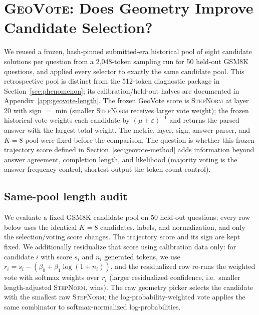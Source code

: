 \section{\textsc{GeoVote}: Does Geometry Improve Candidate Selection?}
\label{sec:geovote}

We reused a frozen, hash-pinned submitted-era historical pool of eight candidate
solutions per question from a 2,048-token sampling run for 50 held-out GSM8K
questions, and applied every selector
to exactly the same candidate pool. This retrospective pool is distinct from
the 512-token diagnostic package in Section~\ref{sec:phenomenon}; its
calibration/held-out halves are documented in
Appendix~\ref{app:geovote-length}. The frozen
GeoVote score is \textsc{StepNorm} at layer 20 with sign $=$ min (smaller
\textsc{StepNorm} receives larger vote weight); the frozen historical vote
weights each candidate by $(\mu+\varepsilon)^{-1}$ and returns the parsed
answer with the largest total weight.
The metric, layer, sign, answer parser, and $K{=}8$ pool were fixed before the
comparison. The question is whether this frozen trajectory score defined in
Section~\ref{sec:geovote-method} adds information beyond answer agreement,
completion length, and likelihood (majority voting is the answer-frequency
control, shortest-output the token-count control).

\subsection{Same-pool length audit}

We evaluate a fixed GSM8K candidate pool on 50 held-out questions; every row
below uses the identical $K{=}8$ candidates, labels, and normalization, and only
the selection/voting score changes.
The trajectory score and its sign are kept fixed. We additionally residualize
that score using calibration data only: for candidate $i$ with score $s_i$ and
$n_i$ generated tokens, we use
$r_i=s_i-(\beta_0+\beta_1\log(1+n_i))$, and the residualized row re-runs the
weighted vote with softmax weights over $r_i$ (larger residualized confidence,
i.e.\ smaller length-adjusted \textsc{StepNorm}, wins).  The raw geometry
picker selects the candidate with the smallest raw \textsc{StepNorm}; the
log-probability-weighted vote applies the same combinator to
softmax-normalized log-probabilities.

